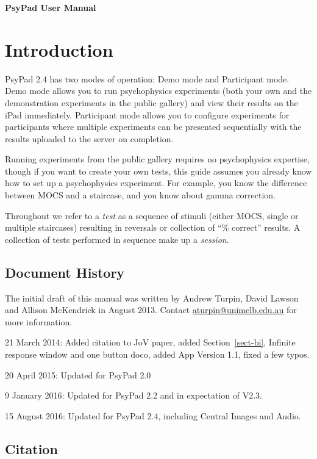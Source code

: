 \documentclass{article}
\begin{document}
{\Large\centering\bf PsyPad User Manual}

\section*{Introduction}

PsyPad 2.4 has two modes of operation: Demo mode and Participant mode.
Demo mode allows you to run psychophysics experiments (both your own
and the demonstration experiments in the public gallery) and view their
results on the iPad immediately.
Participant mode allows you to configure experiments for participants
where multiple experiments can be presented sequentially with the
results uploaded to the server on completion.

Running experiments from the public gallery requires no psychophysics
expertise, though if you want to create your own tests, this guide
assumes you already know how to set up a psychophysics experiment.
For example, you know the difference between MOCS and a staircase,
and you know about gamma correction.

Throughout we refer to a \emph{test} as a sequence of stimuli (either
MOCS, single or multiple staircases) resulting in reversals or
collection of ``\% correct'' results.  A collection of tests performed
in sequence make up a \emph{session}.

\subsection*{Document History}
The initial draft of this manual was written by
Andrew Turpin, David Lawson and Allison McKendrick in August 2013.
Contact \url{aturpin@unimelb.edu.au} for more information.

21 March 2014: Added citation to JoV paper, added Section~\ref{sect-bi}, Infinite response window 
and one button doco, added App Version 1.1, fixed a few typos.

20 April 2015: Updated for PsyPad 2.0

9 January 2016: Updated for PsyPad 2.2 and in expectation of V2.3.

15 August 2016: Updated for PsyPad 2.4, including Central Images and Audio.


\subsection*{Citation}
\end{document}
